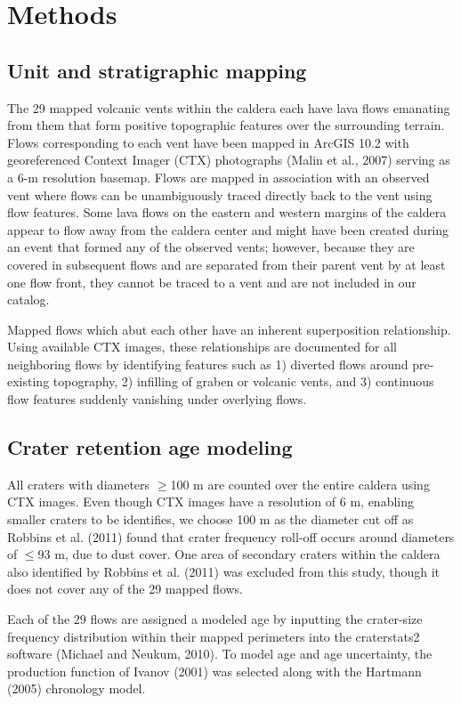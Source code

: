 \documentclass[12pt,letter]{article}
\begin{document}
\section{Methods}

\subsection{Unit and stratigraphic mapping}

The 29 mapped volcanic vents within the caldera each have lava flows emanating from them that form positive topographic features over the surrounding terrain. Flows corresponding to each vent have been mapped in ArcGIS 10.2 with georeferenced Context Imager (CTX) photographs (Malin et al., 2007) serving as a 6-m resolution basemap. Flows are mapped in association with an observed vent where flows can be unambiguously traced directly back to the vent using flow features. Some lava flows on the eastern and western margins of the caldera appear to flow away from the caldera center and might have been created during an event that formed any of the observed vents; however, because they are covered in subsequent flows and are separated from their parent vent by at least one flow front, they cannot be traced to a vent and are not included in our catalog.

Mapped flows which abut each other have an inherent superposition relationship. Using available CTX images, these relationships are documented for all neighboring flows by identifying features such as 1) diverted flows around pre-existing topography, 2) infilling of graben or volcanic vents, and 3) continuous flow features suddenly vanishing under overlying flows.

\subsection{Crater retention age modeling}
All craters with diameters $\ge$100 m are counted over the entire caldera using CTX images. Even though CTX images have a resolution of 6 m, enabling smaller craters to be identifies, we choose 100 m as the diameter cut off as Robbins et al. (2011) found that crater frequency roll-off occurs around diameters of $\le$93 m, due to dust cover. One area of secondary craters within the caldera also identified by Robbins et al. (2011) was excluded from this study, though it does not cover any of the 29 mapped flows.

Each of the 29 flows are assigned a modeled age by inputting the crater-size frequency distribution within their mapped perimeters into the craterstats2 software (Michael and Neukum, 2010). To model age and age uncertainty, the production function of Ivanov (2001) was selected along with the Hartmann (2005) chronology model. 
\end{document}
